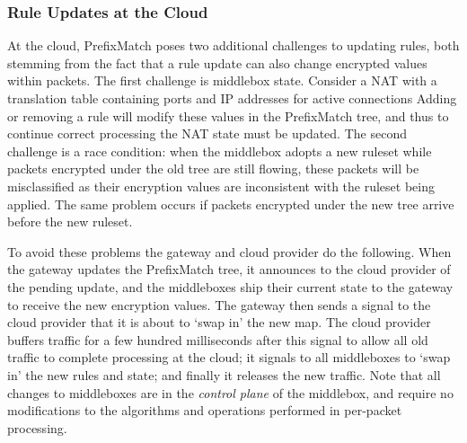 


\subsubsection{Rule Updates at the Cloud}
\label{sec:updates}
At the cloud, PrefixMatch poses two additional challenges to updating rules, both stemming from the fact that a rule update can also change encrypted values within packets.
The first challenge is middlebox state. Consider a NAT with a translation table containing ports and IP addresses for active connections
Adding or removing a rule will modify these values in the PrefixMatch tree, and thus to continue correct processing the NAT state must be updated.
The second challenge is a race condition: when the middlebox adopts a new ruleset while packets encrypted under the old tree are still flowing, these packets will be misclassified as their encryption values are inconsistent with the ruleset being applied. 
The same problem occurs if packets encrypted under the new tree arrive before the new ruleset.

To avoid these problems the gateway and cloud provider do the following. 
When the gateway updates the PrefixMatch tree, it announces to the cloud provider of the pending update, and the middleboxes ship their current state to the gateway to receive the new encryption values.
The gateway then sends a signal to the cloud provider that it is about to `swap in' the new map. 
The cloud provider buffers traffic for a few hundred milliseconds after this signal to allow all old traffic to complete processing at the cloud; it signals to all middleboxes to `swap in' the new rules and state; and finally it releases the new traffic.
Note that all changes to middleboxes are in the {\it control plane} of the middlebox, and require no modifications to the algorithms and operations performed in per-packet processing. 

